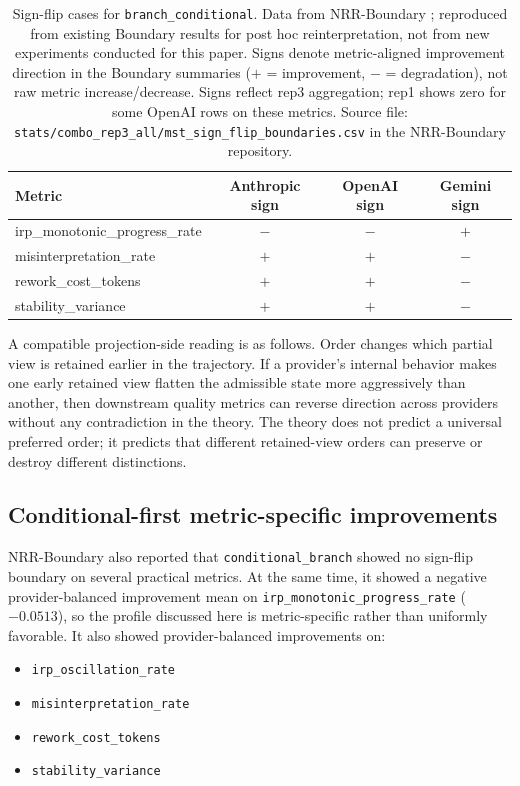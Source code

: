 \documentclass[11pt,a4paper]{article}
\begin{document}
\begin{table}[h]
\centering
\small
\begin{tabular}{p{5.2cm}ccc}
\toprule
Metric & Anthropic sign & OpenAI sign & Gemini sign \\
\midrule
irp\_monotonic\_progress\_rate & $-$ & $-$ & $+$ \\
misinterpretation\_rate & $+$ & $+$ & $-$ \\
rework\_cost\_tokens & $+$ & $+$ & $-$ \\
stability\_variance & $+$ & $+$ & $-$ \\
\bottomrule
\end{tabular}
\caption{Sign-flip cases for \texttt{branch\_conditional}. Data from NRR-Boundary \cite{saito2026boundary}; reproduced from existing Boundary results for post hoc reinterpretation, not from new experiments conducted for this paper. Signs denote metric-aligned improvement direction in the Boundary summaries ($+$ = improvement, $-$ = degradation), not raw metric increase/decrease. Signs reflect rep3 aggregation; rep1 shows zero for some OpenAI rows on these metrics. Source file: \texttt{stats/combo\_rep3\_all/mst\_sign\_flip\_boundaries.csv} in the NRR-Boundary repository.}
\label{tab:boundary_signflip}
\end{table}

A compatible projection-side reading is as follows. Order changes which partial view is retained earlier in the trajectory. If a provider's internal behavior makes one early retained view flatten the admissible state more aggressively than another, then downstream quality metrics can reverse direction across providers without any contradiction in the theory. The theory does not predict a universal preferred order; it predicts that different retained-view orders can preserve or destroy different distinctions.

\subsection{Conditional-first metric-specific improvements}

NRR-Boundary \cite{saito2026boundary} also reported that \texttt{conditional\_branch} showed no sign-flip boundary on several practical metrics. At the same time, it showed a negative provider-balanced improvement mean on \texttt{irp\_monotonic\_progress\_rate} ($-0.0513$), so the profile discussed here is metric-specific rather than uniformly favorable. It also showed provider-balanced improvements on:
\begin{itemize}
  \item \texttt{irp\_oscillation\_rate}
  \item \texttt{misinterpretation\_rate}
  \item \texttt{rework\_cost\_tokens}
  \item \texttt{stability\_variance}
\end{itemize}
\end{document}
